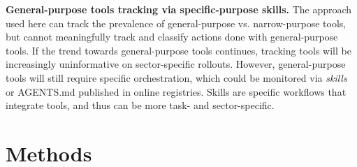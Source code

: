 \documentclass[manuscript,screen,nonacm,oneside]{acmart}
\begin{document}
\textbf{General-purpose tools tracking via specific-purpose skills.} The approach used here can track the prevalence of general-purpose vs. narrow-purpose tools, but cannot meaningfully track and classify actions done with general-purpose tools. If the trend towards general-purpose tools continues, tracking tools will be increasingly uninformative on sector-specific rollouts. However, general-purpose tools will still require specific orchestration, which could be monitored via \emph{skills} or AGENTS.md \citep{agentsAGENTSmd} published in online registries. Skills are specific workflows that integrate tools, and thus can be more task- and sector-specific.

\section{Methods}
\label{sec:methodology}
\end{document}
